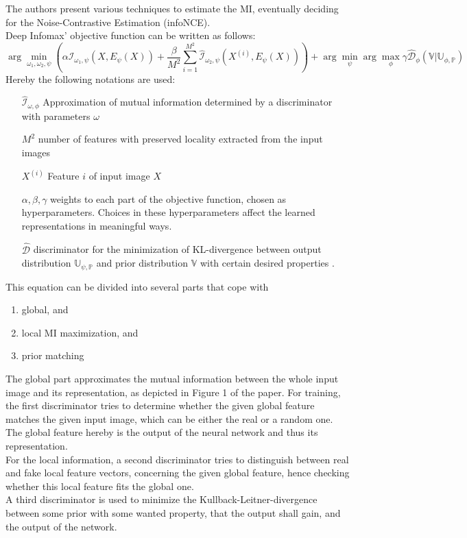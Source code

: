 \documentclass[]{article}
\begin{document}
The authors present various techniques to estimate the MI, eventually deciding for the Noise-Contrastive Estimation (infoNCE).\\

Deep Infomax' objective function can be written as follows:
\begin{equation}
	\arg \min_{\omega_1, \omega_2, \psi} ( \alpha\hat{\mathcal{I}}_{\omega_1,\psi}(X, E_\psi(X)) +\frac{\beta}{M^2}\sum_{i=1}^{M^2} \hat{\mathcal{I}}_{\omega_2,\psi}(X^{(i)}, E_\psi(X)) ) + \arg \min_\psi \arg \max_\phi \gamma\hat{\mathcal{D}}_\phi(\mathbb{V}|\mathbb{U}_{\phi,\mathbb{P}})
\end{equation}
Hereby the following notations are used:
\begin{itemize}
	\item[$\hat{\mathcal{I}}_{\omega,\phi}$] Approximation of mutual information determined by a discriminator with parameters $\omega$
	\item[$M^2$] number of features with preserved locality extracted from the input images
	\item[$X^{(i)}$] Feature $i$ of input image $X$
	\item[$\alpha,\beta,\gamma$] weights to each part of the objective function, chosen as hyperparameters. Choices in these hyperparameters affect the learned representations in meaningful ways.
	\item[$\hat{\mathcal{D}}$] discriminator for the minimization of KL-divergence between output distribution $\mathbb{U_{\psi,\mathbb{P}}}$ and prior distribution $\mathbb{V}$ with certain desired properties .
\end{itemize}

This equation can be divided into several parts that cope with 
\begin{enumerate}
	\item global, and
	\item local MI maximization, and
	\item prior matching
\end{enumerate}
The global part approximates the mutual information between the whole input image and its representation, as depicted in Figure 1 of the paper. For training, the first discriminator tries to determine whether the given global feature matches the given input image, which can be either the real or a random one. The global feature hereby is the output of the neural network and thus its representation. \\
For the local information, a second discriminator tries to distinguish between real and fake local feature vectors, concerning the given global feature, hence checking whether this local feature fits the global one.\\
A third discriminator is used to minimize the Kullback-Leitner-divergence between some prior with some wanted property, that the output shall gain, and the output of the network.
\end{document}
